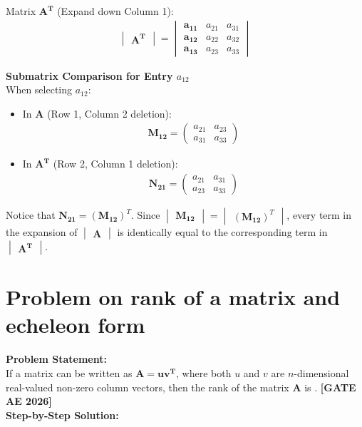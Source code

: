 \documentclass[journal,12pt,onecolumn]{IEEEtran}
\newcommand{\brak}[1]{\left(#1\right)}
\newcommand{\myvec}[1]{\begin{pmatrix}#1\end{pmatrix}}
\newcommand{\mydet}[1]{\begin{vmatrix}#1\end{vmatrix}}
\theoremstyle{remark}
\begin{document}
\noindent
Matrix $\mathbf{A^T}$ (Expand down Column 1):
\begin{align}
\mydet{\mathbf{A^T}} = 
\begin{vmatrix}
\mathbf{a_{11}} & a_{21} & a_{31} \\
\mathbf{a_{12}} & a_{22} & a_{32} \\
\mathbf{a_{13}} & a_{23} & a_{33}
\end{vmatrix}
\end{align}

\vspace{0.5cm}

\noindent \textbf {Submatrix Comparison for Entry $a_{12}$}\\

When selecting $a_{12}$:
\begin{itemize}
    \item In $\mathbf{A}$ (Row 1, Column 2 deletion):
    \begin{align}
    \mathbf{M_{12}} = \myvec{ a_{21} & a_{23} \\ a_{31} & a_{33} }
    \end{align}

    \item In $\mathbf{A^T}$ (Row 2, Column 1 deletion):
    \begin{align}
    \mathbf{N_{21}} = \myvec{ a_{21} & a_{31} \\ a_{23} & a_{33} }
    \end{align}
\end{itemize}

\noindent Notice that $\mathbf{N_{21}} = \brak{\mathbf{M_{12}}}^T$. Since $\mydet{\mathbf{M_{12}}} = \mydet{\brak{\mathbf{M_{12}}}^T}$, every term in the expansion of $\mydet{\mathbf{A}}$ is identically equal to the corresponding term in $\mydet{\mathbf{A^T}}$.
\newpage
\section{Problem on rank of a matrix and echeleon form}

\noindent \textbf{Problem Statement:} \\
If a matrix can be written as $\mathbf{A} = \mathbf{uv^T}$, where both $u$ and $v$ are $n$-dimensional real-valued non-zero column vectors, then the rank of the matrix $\mathbf{A}$ is \underline{\hspace{1cm}}.
\hfill \textbf{[GATE AE 2026]}\\

\noindent \textbf{Step-by-Step Solution:} \\ 
\end{document}
